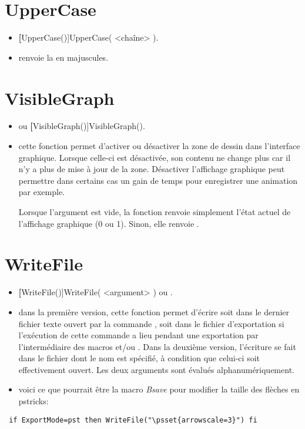 \section{UpperCase}\label{cmdUpperCase}

\begin{itemize}
 \item \util \textbf[UpperCase()]{UpperCase( <chaîne> )}.
 \item \desc renvoie la  en majuscules.
\end{itemize}


\section{VisibleGraph}\label{cmdVisibleGraph}

\begin{itemize}
 \item \util {} ou \textbf[VisibleGraph()]{VisibleGraph()}.
 \item \desc cette fonction permet d'activer ou désactiver la zone de dessin dans l'interface graphique. Lorsque celle-ci est désactivée, son contenu ne change plus car il n'y a plus de mise à jour de la zone. Désactiver l'affichage graphique peut permettre dans certains cas un gain de temps pour enregistrer une animation par exemple.

 Lorsque l'argument est vide, la fonction renvoie simplement l'état actuel de l'affichage graphique (0 ou 1). Sinon, elle renvoie \Nil.
\end{itemize}


\section{WriteFile}\label{cmdWriteFile}

\begin{itemize}
 \item \util \textbf[WriteFile()]{WriteFile( <argument> )} ou . 
 \item \desc dans la première version, cette fonction permet d'écrire soit dans le dernier fichier texte ouvert par la commande , soit dans le fichier d'exportation si l'exécution de cette commande a lieu pendant une exportation par l'intermédiaire des macros  et/ou . Dans la deuxième version, l'écriture se fait dans le fichier dont le nom est spécifié, à condition que celui-ci soit effectivement ouvert. Les deux arguments sont évalués alphanumériquement. 
  \item \exem voici ce que pourrait être la macro \textsl{Bsave} pour modifier la taille des flèches en pstricks:
\end{itemize}

\begin{verbatim}
 if ExportMode=pst then WriteFile("\psset{arrowscale=3}") fi
\end{verbatim}
